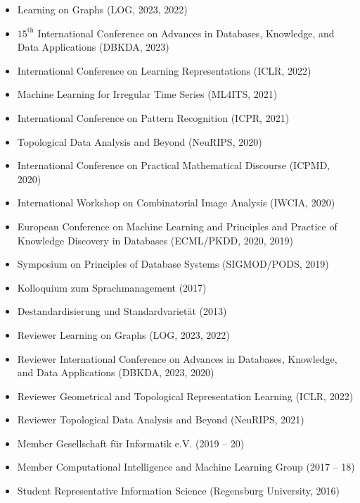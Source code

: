 \documentclass[a4paper,12pt]{article}
\newcommand{\years}[1]{\marginnote{\scriptsize #1}}
\begin{document}
\years{Conferences}
\vspace{-2pt}
\begin{itemize}[noitemsep, leftmargin=*]
    \item Learning on Graphs (LOG, 2023, 2022)
    \item $15^{\text{th}}$ International Conference on Advances in Databases, Knowledge,
          and Data Applications (DBKDA, 2023)
    \item International Conference on Learning Representations (ICLR, 2022)
    \item Machine Learning for Irregular Time Series (ML4ITS, 2021)
    \item International Conference on Pattern Recognition (ICPR, 2021)
    \item Topological Data Analysis and Beyond (NeuRIPS, 2020)
    \item International Conference on Practical Mathematical Discourse (ICPMD, 2020)
    \item International Workshop on Combinatorial Image Analysis (IWCIA, 2020)
    \item European Conference on Machine Learning and Principles and Practice of Knowledge Discovery in Databases (ECML/PKDD, 2020, 2019)
    \item Symposium on Principles of Database Systems (SIGMOD/PODS, 2019)
    \item Kolloquium zum Sprachmanagement (2017)
    \item Destandardisierung und Standardvarietät (2013)
\end{itemize}
\vspace{10pt}

\years{Service}
\vspace{-2pt}
\begin{itemize}[noitemsep, leftmargin=*]
    \item Reviewer Learning on Graphs (LOG, 2023, 2022)
    \item Reviewer International Conference on Advances in Databases, Knowledge,
          and Data Applications (DBKDA, 2023, 2020)
    \item Reviewer Geometrical and Topological Representation Learning (ICLR, 2022)
    \item Reviewer Topological Data Analysis and Beyond (NeuRIPS, 2021)
    \item Member Gesellschaft für Informatik e.V. (2019 -- 20)
    \item Member Computational Intelligence and Machine Learning Group (2017 -- 18)
    \item Student Representative Information Science (Regensburg University, 2016)
\end{itemize}
\vspace{10pt}
\end{document}
